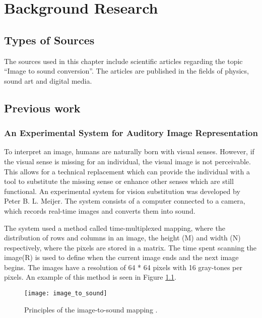 \chapter{Background Research}\label{ch:bgresearch}

\section{Types of Sources}\label{sec:typesofsources} 
The sources used in this chapter include scientific articles regarding the topic “Image to sound conversion”. The articles are published in the fields of physics, sound art and digital media.

\section{Previous work}\label{sec:previouswork}

\subsection{An Experimental System for Auditory Image Representation}\label{sec:experimentalsystem}

To interpret an image, humans are naturally born with visual senses. However, if the visual sense is missing for an individual, the visual image is not perceivable. This allows for a technical replacement which can provide the individual with a tool to substitute the missing sense or enhance other senses which are still functional. An experimental system for vision substitution was developed by Peter B. L. Meijer\cite{Meijer1992}. The system consists of a computer connected to a camera, which records real-time images and converts them into sound. 

The system used a method called time-multiplexed mapping, where the distribution of rows and columns in an image, the height (M) and width (N) respectively, where the pixels are stored in a matrix. The time spent scanning the image(R) is used to define when the current image ends and the next image begins. The images have a resolution of 64 * 64 pixels with 16 gray-tones per pixels. An example of this method is seen in Figure \ref{fig:image_to_sound}. 

\begin{figure}[!h] 
\centering
\texttt{[image: image\_to\_sound]}
\caption{\label{fig:image_to_sound} Principles of the image-to-sound mapping \cite{Meijer1992}.}
\end{figure}
  
